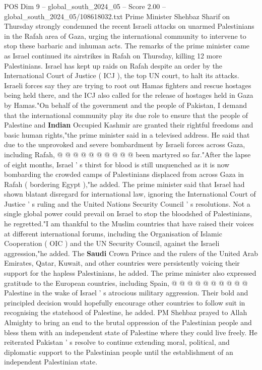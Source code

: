 \begin{textsample}{POS Dim 9 – global\_south\_2024\_05 – Score 2.00 – global\_south\_2024\_05/108618032.txt}  \label{ex:f9_pos_037}
Prime Minister Shehbaz Sharif on Thursday strongly condemned the recent Israeli attacks on unarmed Palestinians in the Rafah area of Gaza, urging the international community to intervene to stop these barbaric and inhuman acts.
The remarks of the prime minister came as Israel continued its airstrikes in Rafah on Thursday, killing 12 more Palestinians.
Israel has kept up raids on Rafah despite an order by the International Court of Justice ( ICJ ), the top UN court, to halt its attacks.
Israeli forces say they are trying to root out Hamas fighters and rescue hostages being held there, and the ICJ also called for the release of hostages held in Gaza by Hamas."On behalf of the government and the people of Pakistan, I demand that the international community play its due role to ensure that the people of Palestine and \textbf{Indian} Occupied Kashmir are granted their rightful freedoms and basic human rights,"the prime minister said in a televised address.
He said that due to the unprovoked and severe bombardment by Israeli forces across Gaza, including Rafah, @ @ @ @ @ @ @ @ @ @ been martyred so far."After the lapse of eight months, Israel ' s thirst for blood is still unquenched as it is now bombarding the crowded camps of Palestinians displaced from across Gaza in Rafah ( bordering Egypt ),"he added.
The prime minister said that Israel had shown blatant disregard for international law, ignoring the International Court of Justice ' s ruling and the United Nations Security Council ' s resolutions.
Not a single global power could prevail on Israel to stop the bloodshed of Palestinians, he regretted."I am thankful to the Muslim countries that have raised their voices at different international forums, including the Organisation of Islamic Cooperation ( OIC ) and the UN Security Council, against the Israeli aggression,"he added.
The \textbf{Saudi} Crown Prince and the rulers of the United Arab Emirates, Qatar, Kuwait, and other countries were persistently voicing their support for the hapless Palestinians, he added.
The prime minister also expressed gratitude to the European countries, including Spain, @ @ @ @ @ @ @ @ @ @ Palestine in the wake of Israel ' s atrocious military aggression.
Their bold and principled decision would hopefully encourage other countries to follow suit in recognising the statehood of Palestine, he added.
PM Shehbaz prayed to Allah Almighty to bring an end to the brutal oppression of the Palestinian people and bless them with an independent state of Palestine where they could live freely.
He reiterated Pakistan ' s resolve to continue extending moral, political, and diplomatic support to the Palestinian people until the establishment of an independent Palestinian state.

\end{textsample}
